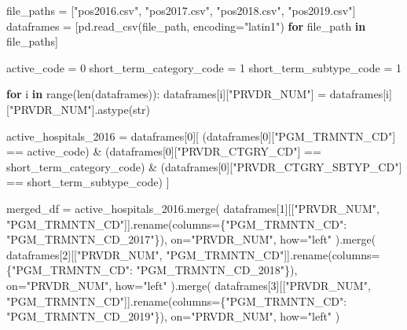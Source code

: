 \documentclass[
  letterpaper,
  DIV=11,
  numbers=noendperiod]{scrartcl}
\newenvironment{Shaded}{\begin{snugshade}}{\end{snugshade}}
\newcommand{\BuiltInTok}[1]{\textcolor[rgb]{0.00,0.23,0.31}{#1}}
\newcommand{\ControlFlowTok}[1]{\textcolor[rgb]{0.00,0.23,0.31}{\textbf{#1}}}
\newcommand{\DecValTok}[1]{\textcolor[rgb]{0.68,0.00,0.00}{#1}}
\newcommand{\KeywordTok}[1]{\textcolor[rgb]{0.00,0.23,0.31}{\textbf{#1}}}
\newcommand{\NormalTok}[1]{\textcolor[rgb]{0.00,0.23,0.31}{#1}}
\newcommand{\OperatorTok}[1]{\textcolor[rgb]{0.37,0.37,0.37}{#1}}
\newcommand{\StringTok}[1]{\textcolor[rgb]{0.13,0.47,0.30}{#1}}
\begin{document}
\begin{Shaded}
\begin{Highlighting}[]
\NormalTok{file\_paths }\OperatorTok{=}\NormalTok{ [}\StringTok{"pos2016.csv"}\NormalTok{, }\StringTok{"pos2017.csv"}\NormalTok{, }\StringTok{"pos2018.csv"}\NormalTok{, }\StringTok{"pos2019.csv"}\NormalTok{]}
\NormalTok{dataframes }\OperatorTok{=}\NormalTok{ [pd.read\_csv(file\_path, encoding}\OperatorTok{=}\StringTok{"latin1"}\NormalTok{) }\ControlFlowTok{for}\NormalTok{ file\_path }\KeywordTok{in}\NormalTok{ file\_paths]}

\NormalTok{active\_code }\OperatorTok{=} \DecValTok{0}
\NormalTok{short\_term\_category\_code }\OperatorTok{=} \DecValTok{1}
\NormalTok{short\_term\_subtype\_code }\OperatorTok{=} \DecValTok{1}

\ControlFlowTok{for}\NormalTok{ i }\KeywordTok{in} \BuiltInTok{range}\NormalTok{(}\BuiltInTok{len}\NormalTok{(dataframes)):}
\NormalTok{    dataframes[i][}\StringTok{"PRVDR\_NUM"}\NormalTok{] }\OperatorTok{=}\NormalTok{ dataframes[i][}\StringTok{"PRVDR\_NUM"}\NormalTok{].astype(}\BuiltInTok{str}\NormalTok{)}

\NormalTok{active\_hospitals\_2016 }\OperatorTok{=}\NormalTok{ dataframes[}\DecValTok{0}\NormalTok{][}
\NormalTok{    (dataframes[}\DecValTok{0}\NormalTok{][}\StringTok{"PGM\_TRMNTN\_CD"}\NormalTok{] }\OperatorTok{==}\NormalTok{ active\_code)}
    \OperatorTok{\&}\NormalTok{ (dataframes[}\DecValTok{0}\NormalTok{][}\StringTok{"PRVDR\_CTGRY\_CD"}\NormalTok{] }\OperatorTok{==}\NormalTok{ short\_term\_category\_code)}
    \OperatorTok{\&}\NormalTok{ (dataframes[}\DecValTok{0}\NormalTok{][}\StringTok{"PRVDR\_CTGRY\_SBTYP\_CD"}\NormalTok{] }\OperatorTok{==}\NormalTok{ short\_term\_subtype\_code)}
\NormalTok{]}

\NormalTok{merged\_df }\OperatorTok{=}\NormalTok{ active\_hospitals\_2016.merge(}
\NormalTok{    dataframes[}\DecValTok{1}\NormalTok{][[}\StringTok{"PRVDR\_NUM"}\NormalTok{, }\StringTok{"PGM\_TRMNTN\_CD"}\NormalTok{]].rename(columns}\OperatorTok{=}\NormalTok{\{}\StringTok{"PGM\_TRMNTN\_CD"}\NormalTok{: }\StringTok{"PGM\_TRMNTN\_CD\_2017"}\NormalTok{\}),}
\NormalTok{    on}\OperatorTok{=}\StringTok{"PRVDR\_NUM"}\NormalTok{, how}\OperatorTok{=}\StringTok{"left"}
\NormalTok{).merge(}
\NormalTok{    dataframes[}\DecValTok{2}\NormalTok{][[}\StringTok{"PRVDR\_NUM"}\NormalTok{, }\StringTok{"PGM\_TRMNTN\_CD"}\NormalTok{]].rename(columns}\OperatorTok{=}\NormalTok{\{}\StringTok{"PGM\_TRMNTN\_CD"}\NormalTok{: }\StringTok{"PGM\_TRMNTN\_CD\_2018"}\NormalTok{\}),}
\NormalTok{    on}\OperatorTok{=}\StringTok{"PRVDR\_NUM"}\NormalTok{, how}\OperatorTok{=}\StringTok{"left"}
\NormalTok{).merge(}
\NormalTok{    dataframes[}\DecValTok{3}\NormalTok{][[}\StringTok{"PRVDR\_NUM"}\NormalTok{, }\StringTok{"PGM\_TRMNTN\_CD"}\NormalTok{]].rename(columns}\OperatorTok{=}\NormalTok{\{}\StringTok{"PGM\_TRMNTN\_CD"}\NormalTok{: }\StringTok{"PGM\_TRMNTN\_CD\_2019"}\NormalTok{\}),}
\NormalTok{    on}\OperatorTok{=}\StringTok{"PRVDR\_NUM"}\NormalTok{, how}\OperatorTok{=}\StringTok{"left"}
\NormalTok{)}


\end{Highlighting}
\end{Shaded}
\end{document}
